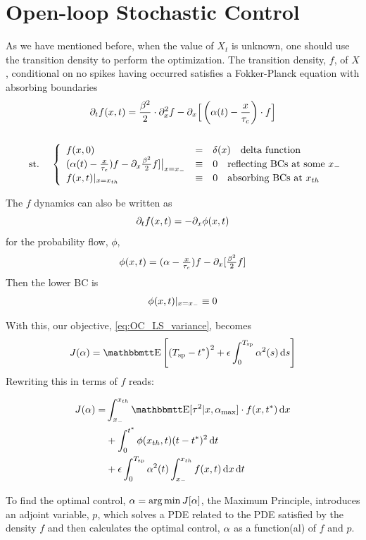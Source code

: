 \documentclass{article}
\begin{document}
\section{Open-loop Stochastic Control}
As we have mentioned before, when the value of $X_t$ is unknown, one should use
the transition density to perform the optimization. The transition density, $f$,
of $X$, conditional on no spikes having occurred satisfies a Fokker-Planck
equation with absorbing boundaries
\begin{equation}
\begin{gathered}
{\partial}_t f(x,t) =
				\frac{{\beta}^2 }{2}\cdot {\partial}^2_x f -  
				{\partial}_x \Big[ \left({\alpha}(t)- \frac{x}{{ \tau_{c} }}\right)  \cdot f \Big]
\\
\\
\begin{array}{lll}
	&\textrm{st.\ }& 
	\left\{ \begin{array}{lcl}
	 f(x,0) &=& \delta(x) \quad \textrm{delta function}
	\\
	({\alpha}(t)- \tfrac x {{ \tau_{c} }})f - {\partial}_x \tfrac {{\beta}^2}2 f] \big|_{x={ x_{-} }} &\equiv& 0
	\quad \textrm{reflecting BCs at some } { x_{-} } 
	\\
	f(x,t) |_{x={ x_{th} }} &\equiv& 0 \quad \textrm{absorbing BCs at } { x_{th} }
\end{array} \right. 
\end{array}
\label{eq:FP_pde_OU_PDF}
\end{gathered}
\end{equation}

The $f$ dynamics can also be written as
$$
{\partial}_t f(x,t) = - {\partial}_x \phi(x,t)
$$
for the probability flow, $\phi$, 
$$
\phi(x,t) = ({\alpha}- \tfrac x {{ \tau_{c} }})f - {\partial}_x [\tfrac {{\beta}^2}2 f]
$$
Then the lower BC is
$$
\phi(x,t) |_{x={ x_{-} }} \equiv 0
$$

With this, our objective, \cref{eq:OC_LS_variance}, becomes
$$
J(\a) = \Exp\left[
(\ts - \T \big)^2 
+  
\e \int_0^\ts  \a^2(s) \intd{s}
\right]
$$
Rewriting this in terms of $f$ reads:

\begin{align}
J(\a) =& 
\int_\xmin^\xth \Exp[\t^2|x, \amax] \cdot f(x,\T) \intd{x}
\notag
\\
&+ \int_0^\T \phi(\xth, t) (t-\T)^2 \intd{t}
\notag
\\
&+  \e \int_0^\ts  \a^2(t)  \int_\xmin^\xth f(x,t) \intd{x} \intd{t}
\label{eq:OC_LS_variance_density}
\end{align}

To find the optimal control, $\a = \argmin J[\a]$, the Maximum Principle,
\cite{Ahmed1981} introduces an adjoint variable, $p$,
which solves a PDE related to the PDE satisfied by the density $f$ and then calculates the optimal
control, ${\alpha}$ as a function(al) of $f$ and $p$.
\end{document}
